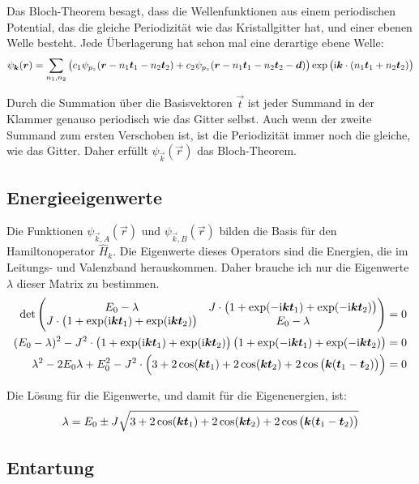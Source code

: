Das Bloch-Theorem besagt, dass die Wellenfunktionen aus einem periodischen
Potential, das die gleiche Periodizität wie das Kristallgitter hat, und einer
ebenen Welle besteht. Jede Überlagerung hat schon mal eine derartige ebene
Welle:
\[
	\psi_{\vec k} (\vec r)
	= 
	\sum_{n_1, n_2} \del{c_1 \psi_{p_z} (\vec r - n_1 \vec t_1 - n_2 \vec t_2) + c_2 \psi_{p_z} (\vec r - n_1 \vec t_1 - n_2 \vec t_2 - \vec d)} \exp\del{\ii \vec k \cdot (n_1 \vec t_1 + n_2 \vec t_2)}
\]

Durch die Summation über die Basisvektoren $\vec t$ ist jeder Summand in der
Klammer genauso periodisch wie das Gitter selbst. Auch wenn der zweite Summand
zum ersten Verschoben ist, ist die Periodizität immer noch die gleiche, wie das
Gitter. Daher erfüllt $\psi_{\vec k}(\vec r)$ das Bloch-Theorem.

\subsection{Energieeigenwerte}

Die Funktionen $\psi_{\vec k, A}(\vec r)$ und $\psi_{\vec k, B}(\vec r)$ bilden
die Basis für den Hamiltonoperator $\hat H_k$. Die Eigenwerte dieses Operators
sind die Energien, die im Leitungs- und Valenzband herauskommen. Daher brauche
ich nur die Eigenwerte $\lambda$ dieser Matrix zu bestimmen.
\begin{align*}
	\det \begin{pmatrix}
		E_0 - \lambda & J\cdot\del{1 + \exp(-\ii \vec k \vec t_1) + \exp(-\ii \vec k \vec t_2)} \\
		J\cdot\del{1 + \exp(\ii \vec k \vec t_1) + \exp(\ii \vec k \vec t_2)} & E_0 - \lambda
	\end{pmatrix}
	&= 0 \\
	(E_0 - \lambda)^2 - J^2\cdot \del{1 + \exp(\ii \vec k \vec t_1) + \exp(\ii \vec k \vec t_2)} \del{1 + \exp(-\ii \vec k \vec t_1) + \exp(-\ii \vec k \vec t_2)} &= 0 \\
	\lambda^2 - 2 E_0 \lambda + E_0^2 - J^2\cdot \del{3 + 2\cos(\vec k \vec t_1) + 2 \cos(\vec k \vec t_2) + 2 \cos\del{\vec k (\vec t_1 - \vec t_2)}} &= 0
\end{align*}

Die Lösung für die Eigenwerte, und damit für die Eigenenergien, ist:
\[
	\lambda = E_0 \pm J \sqrt{3 + 2\cos(\vec k \vec t_1) + 2 \cos(\vec k \vec t_2) + 2 \cos\del{\vec k (\vec t_1 - \vec t_2)}}
\]

\subsection{Entartung}

